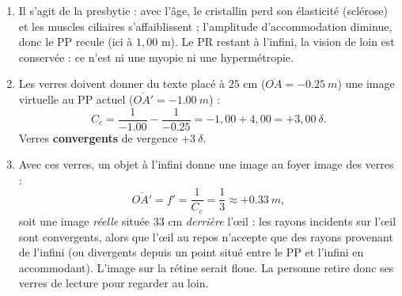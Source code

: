 \documentclass[11pt]{article}
\newcommand{\cle}[1]{{\popxbold\color{popdark}#1}}
\begin{document}
\begin{corrige}
\begin{enumerate}
\item Il s'agit de la \cle{presbytie} : avec l'âge, le cristallin perd son élasticité (sclérose) et les muscles ciliaires s'affaiblissent ; l'amplitude d'accommodation diminue, donc le PP recule (ici à $1{,}00$ m). Le PR restant à l'infini, la vision de loin est conservée : ce n'est ni une myopie ni une hypermétropie.
\item Les verres doivent donner du texte placé à $25$ cm ($\overline{OA} = -\SI{0,25}{m}$) une image virtuelle au PP actuel ($\overline{OA'} = -\SI{1,00}{m}$) :
\[ C_c = \frac{1}{-\num{1,00}} - \frac{1}{-\num{0,25}} = -1,00 + 4,00 = +3,00\ \delta. \]
Verres \textbf{convergents} de vergence $+3\ \delta$.
\item Avec ces verres, un objet à l'infini donne une image au foyer image des verres :
\[ \overline{OA'} = f' = \frac{1}{C_c} = \frac{1}{3} \approx +\SI{0,33}{m}, \]
soit une image \emph{réelle} située $33$ cm \emph{derrière} l'œil : les rayons incidents sur l'œil sont convergents, alors que l'œil au repos n'accepte que des rayons provenant de l'infini (ou divergents depuis un point situé entre le PP et l'infini en accommodant). L'image sur la rétine serait floue. La personne retire donc ses verres de lecture pour regarder au loin.
\end{enumerate}
\end{corrige}
\end{document}
